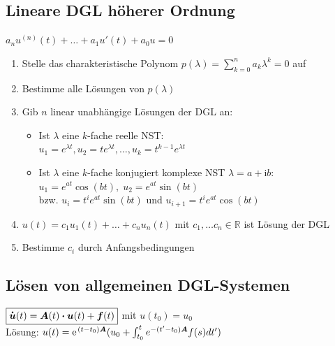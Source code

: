 \documentclass[6pt,a4paper]{scrartcl}
\newcommand{\ma}[1]{\ensuremath{\boldsymbol {#1}}}                                              %
\newcommand{\bdot}{\ensuremath{\boldsymbol \cdot}}                                              %
\renewcommand{\vec}[1]{\ensuremath{\boldsymbol {#1}}}                                           %
\renewcommand*{\dot}[1]{\accentset{\mbox{\textrm{\large\bfseries .}} }{#1}}                     %
\renewcommand{\i}{\ensuremath{\mathrm{i}}}                                     %
\newcommand{\R}{\ensuremath{\mathbb R}}
\begin{document}
\begin{multicols*}{4}
    \subsection{Lineare DGL höherer Ordnung}
    $\boxed{a_nu^{(n)}(t) + \hdots + a_1u'(t)+a_0u = 0}$\\
    \begin{enumerate}\itemsep0pt 
        \item Stelle das charakteristische Polynom $p(\lambda) = \sum^n_{k=0} a_k \lambda^k = 0$ auf
        \item Bestimme alle Lösungen von $p(\lambda)$
        \item Gib $n$ linear unabhängige Lösungen der DGL an:
              \begin{itemize}\itemsep0pt 
                  \item     Ist $ \lambda$ eine $k$-fache reelle NST:\\
                        $u_1 = e^{\lambda t}, u_2 = te^{\lambda t}, \hdots, u_{k} = t^{k-1} e^{ \lambda t}$\\
                  \item Ist $ \lambda$ eine $k$-fache konjugiert komplexe NST $\lambda = a + \i b$:\\
                        $u_1 = e^{at} \cos (bt),\; u_2 = e^{at} \sin (bt)$ \\
                        bzw. $u_i = t^i e^{at} \sin (bt)$ und $u_{i+1} =  t^i e^{at} \cos (bt)$
              \end{itemize}
        \item $u(t) = c_1 u_1 (t) + \ldots + c_n u_n (t)$ mit $c_1, \ldots c_n \in \R$ ist Lösung der DGL
        \item Bestimme $c_i$ durch Anfangsbedingungen
    \end{enumerate}

    \subsection{Lösen von allgemeinen DGL-Systemen}
    $\boxed{\dot {\vec u}(t) = \ma A(t) \bdot \vec u(t) + \vec f(t)}$ mit $u(t_0) = u_0$\\
    Lösung: $u(t) = \e^{(t-t_0)\ma A}(u_0 + \int_{t_0}^t e^{-(t'-t_0)\ma A}f(s)dt')$\\

\end{multicols*}
\end{document}
